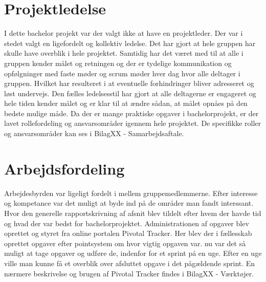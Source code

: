 %
% 



 


\chapter{Projektledelse}
I dette bachelor projekt var der valgt ikke at have en projektleder. Der var i stedet valgt en ligefordelt og kollektiv ledelse. Det har gjort at hele gruppen har skulle have overblik i hele projektet. Samtidig har det været med til at alle i gruppen kender målet og retningen og der er tydelige kommunikation og opfølgninger med faste møder og scrum møder hver dag hvor alle deltager i gruppen. Hvilket har resulteret i at eventuelle forhindringer bliver adresseret og løst undervejs. Den fælles ledelsesstil har gjort at alle deltagerne er engageret og hele tiden kender målet og er klar til at ændre sådan, at målet opnåes på den bedste mulige måde. Da der er mange praktiske opgaver i bachelorprojekt, er der lavet rollefordeling og ansvarsområder igennem hele projektet. De specifikke roller og ansvarsområder kan ses i BilagXX - Samarbejdsaftale.



\chapter{Arbejdsfordeling}
Arbejdesbyrden var ligeligt fordelt i mellem gruppemedlemmerne. Efter interesse og kompetance var det muligt at byde ind på de områder man fandt interssant. Hvor den generelle rapportskrivning af afsnit blev tildelt efter hvem der havde tid og hvad der var bedst for bachelorprojektet. Administrationen  af opgaver blev oprettet og styret fra online portalen Pivotal Tracker. Her blev der i fællesskab oprettet opgaver efter pointsystem om hvor vigtig opgaven var. nu var det så muligt at tage opgaver og udføre de, indenfor for et sprint på en uge. Efter en uge ville man kunne få et overblik over afsluttet opgave i det pågældende sprint. En nærmere beskrivelse og brugen af Pivotal Tracker findes i BilagXX - Værktøjer. 





